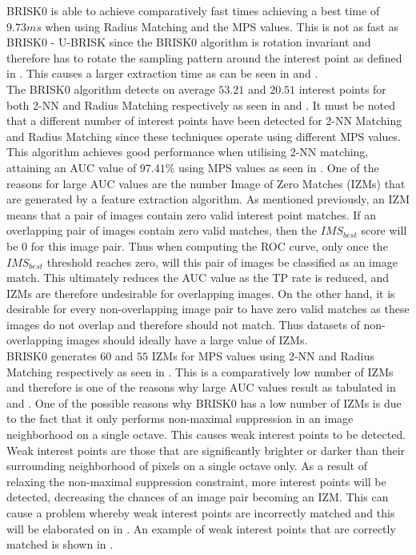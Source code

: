 \documentclass[11pt]{report}
\begin{document}
BRISK0 is able to achieve comparatively fast times achieving a best time of $9.73 ms$ when using Radius Matching and the MPS values. This is not as fast as BRISK0 - U-BRISK since the BRISK0 algorithm is rotation invariant and therefore has to rotate the sampling pattern around the interest point as defined in . This causes a larger extraction time as can be seen in  and .\\

The BRISK0 algorithm detects on average $53.21$ and $20.51$ interest points for both 2-NN and Radius Matching respectively as seen in  and . It must be noted that a different number of interest points have been detected for 2-NN Matching and Radius Matching since these techniques operate using different MPS values. \\

This algorithm achieves good performance when utilising 2-NN matching, attaining an AUC value of $97.41\%$ using MPS values as seen in . One of the reasons for large AUC values are the number Image of Zero Matches (IZMs) that are generated by a feature extraction algorithm. As mentioned previously, an IZM means that a pair of images contain zero valid interest point matches. If an overlapping pair of images contain zero valid matches, then the $IMS_{best}$ score will be $0$ for this image pair. Thus when computing the ROC curve, only once the $IMS_{best}$ threshold reaches zero, will this pair of images be classified as an image match. This ultimately reduces the AUC value as the TP rate is reduced, and IZMs are therefore undesirable for overlapping images. On the other hand, it is desirable for every non-overlapping image pair to have zero valid matches as these images do not overlap and therefore should not match. Thus datasets of non-overlapping images should ideally have a large value of IZMs.\\

BRISK0 generates $60$ and $55$ IZMs for MPS values using 2-NN and Radius Matching respectively as seen in . This is a comparatively low number of IZMs and therefore is one of the reasons why large AUC values result as tabulated in  and . One of the possible reasons why BRISK0 has a low number of IZMs is due to the fact that it only performs non-maximal suppression in an image neighborhood on a single octave. This causes weak interest points to be detected. Weak interest points are those that are significantly brighter or darker than their surrounding neighborhood of pixels on a single octave only. As a result of relaxing the non-maximal suppression constraint, more interest points will be detected, decreasing the chances of an image pair becoming an IZM. This can cause a problem whereby weak interest points are incorrectly matched and this will be elaborated on in . An example of weak interest points that are correctly matched is shown in .\\
\end{document}
